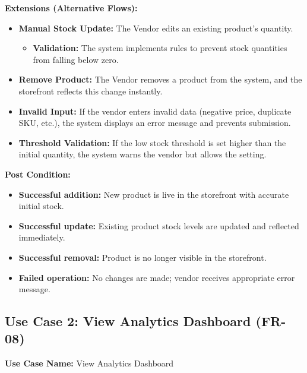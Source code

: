 \textbf{Extensions (Alternative Flows):}
\begin{itemize}
    \item[3a.] \textbf{Manual Stock Update:} The Vendor edits an existing product's quantity.
    \begin{itemize}
        \item \textbf{Validation:} The system implements rules to prevent stock quantities from falling below zero.
    \end{itemize}
    
    \item[3b.] \textbf{Remove Product:} The Vendor removes a product from the system, and the storefront reflects this change instantly.
    
    \item[4a.] \textbf{Invalid Input:} If the vendor enters invalid data (negative price, duplicate SKU, etc.), the system displays an error message and prevents submission.
    
    \item[5a.] \textbf{Threshold Validation:} If the low stock threshold is set higher than the initial quantity, the system warns the vendor but allows the setting.
\end{itemize}

\textbf{Post Condition:}
\begin{itemize}
    \item \textbf{Successful addition:} New product is live in the storefront with accurate initial stock.
    \item \textbf{Successful update:} Existing product stock levels are updated and reflected immediately.
    \item \textbf{Successful removal:} Product is no longer visible in the storefront.
    \item \textbf{Failed operation:} No changes are made; vendor receives appropriate error message.
\end{itemize}

\subsection*{Use Case 2: View Analytics Dashboard (FR-08)}

\textbf{Use Case Name:} View Analytics Dashboard

